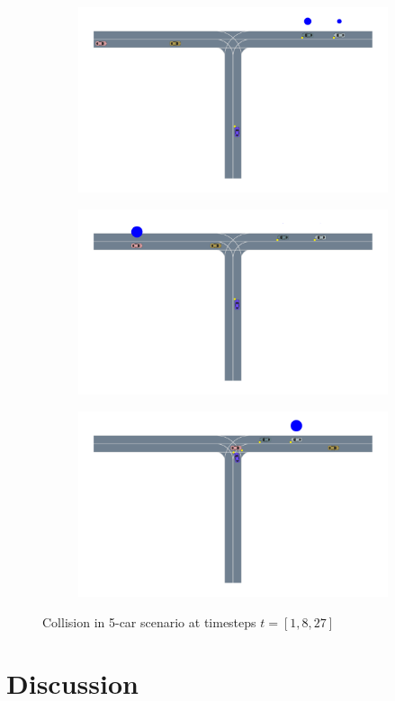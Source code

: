 \begin{figure}
    \centering
   \begin{subfigure}[t]{0.7\textwidth}
        \centering
        \includegraphics[width=\textwidth, trim={2cm 5cm 1cm 0},clip]{figures/scene_decomposition/f2_1.pdf}
    \end{subfigure}
    \begin{subfigure}[t]{0.7\textwidth}
        \centering
        \includegraphics[width=\textwidth, trim={2cm 5cm 1cm 0},clip]{figures/scene_decomposition/f2_8.pdf}
    \end{subfigure}
    \begin{subfigure}[t]{0.7\textwidth}
    \centering
    \includegraphics[width=\textwidth, trim={2cm 5cm 1cm 0},clip]{figures/scene_decomposition/f2_27.pdf}
\end{subfigure}
    \caption{Collision in 5-car scenario at timesteps $t=[1,8,27]$}
    \label{fig:two_car_collision}
    \vspace{-0.2in}
\end{figure}


\section{Discussion}